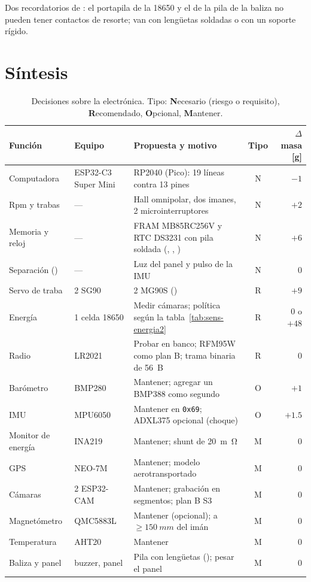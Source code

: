Dos recordatorios de : el portapila de la 18650 y el de la pila de la baliza no pueden
tener contactos de resorte; van con lengüetas soldadas o con un soporte rígido.

\section{Síntesis}\label{sec:sens-sintesis}

\begin{table}[H]
\centering\small
\caption{Decisiones sobre la electrónica. Tipo: \textbf{N}ecesario (riesgo o requisito), \textbf{R}ecomendado,
\textbf{O}pcional, \textbf{M}antener.}\label{tab:sens-resumen}
\begin{tabularx}{\textwidth}{@{}p{2.4cm}p{2.5cm}Ycr@{}}
\toprule
\textbf{Función} & \textbf{Equipo} & \textbf{Propuesta y motivo} & \textbf{Tipo} & \textbf{$\Delta$masa} [g]\\\midrule
Computadora & ESP32-C3 Super Mini & RP2040 (Pico): 19 líneas contra 13 pines & N & $-1$\\
Rpm y trabas & --- & Hall omnipolar, dos imanes, 2 microinterruptores & N & $+2$\\
Memoria y reloj & --- & FRAM MB85RC256V y RTC DS3231 con pila soldada (, , ) & N & $+6$\\
Separación () & --- & Luz del panel y pulso de la IMU & N & $0$\\
Servo de traba & 2 SG90 & 2 MG90S () & R & $+9$\\
Energía & 1 celda 18650 & Medir cámaras; política según la tabla~\ref{tab:sens-energia2} & R & $0$ o $+48$\\
Radio & LR2021 & Probar en banco; RFM95W como plan B; trama binaria de \SI{56}{B} & R & $0$\\
Barómetro & BMP280 & Mantener; agregar un BMP388 como segundo & O & $+1$\\
IMU & MPU6050 & Mantener en \texttt{0x69}; ADXL375 opcional (choque) & O & $+1.5$\\
Monitor de energía & INA219 & Mantener; shunt de \SI{20}{m\ohm} & M & $0$\\
GPS & NEO-7M & Mantener; modelo aerotransportado & M & $0$\\
Cámaras & 2 ESP32-CAM & Mantener; grabación en segmentos; plan B S3 & M & $0$\\
Magnetómetro & QMC5883L & Mantener (opcional); a $\ge\SI{150}{mm}$ del imán & M & $0$\\
Temperatura & AHT20 & Mantener & M & $0$\\
Baliza y panel & buzzer, panel & Pila con lengüetas (); pesar el panel & M & $0$\\
\bottomrule
\end{tabularx}
\end{table}

